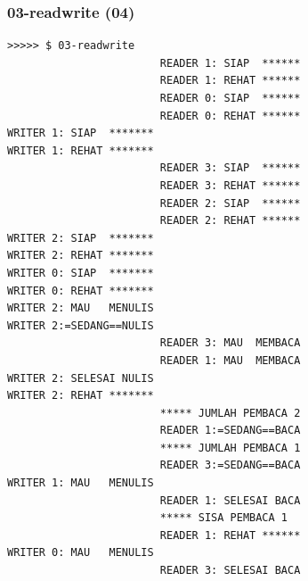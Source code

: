 \documentclass[aspectratio=169, xcolor=table, notheorems, hyperref={pdfpagelabels=false}]{beamer}
\begin{document}
\begin{frame}[fragile]
\frametitle{03-readwrite (04)}
\begin{lstlisting}[basicstyle=\ttfamily\tiny]
>>>>> $ 03-readwrite 
                        READER 1: SIAP  ******
                        READER 1: REHAT ******
                        READER 0: SIAP  ******
                        READER 0: REHAT ******
WRITER 1: SIAP  *******
WRITER 1: REHAT *******
                        READER 3: SIAP  ******
                        READER 3: REHAT ******
                        READER 2: SIAP  ******
                        READER 2: REHAT ******
WRITER 2: SIAP  *******
WRITER 2: REHAT *******
WRITER 0: SIAP  *******
WRITER 0: REHAT *******
WRITER 2: MAU   MENULIS
WRITER 2:=SEDANG==NULIS
                        READER 3: MAU  MEMBACA
                        READER 1: MAU  MEMBACA
WRITER 2: SELESAI NULIS
WRITER 2: REHAT *******
                        ***** JUMLAH PEMBACA 2
                        READER 1:=SEDANG==BACA
                        ***** JUMLAH PEMBACA 1
                        READER 3:=SEDANG==BACA
WRITER 1: MAU   MENULIS
                        READER 1: SELESAI BACA
                        ***** SISA PEMBACA 1
                        READER 1: REHAT ******
WRITER 0: MAU   MENULIS
                        READER 3: SELESAI BACA

\end{lstlisting}
\end{frame}

\end{document}
